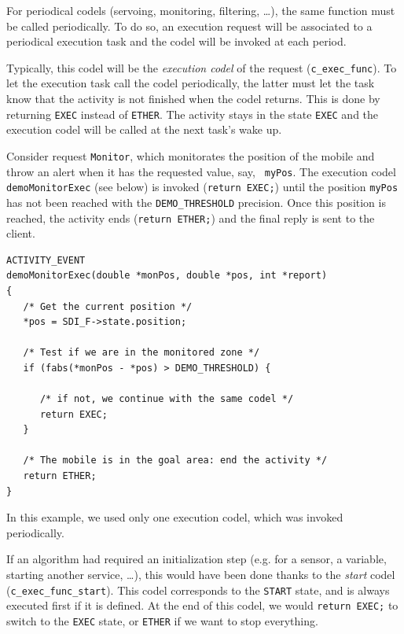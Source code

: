 For periodical codels (servoing, monitoring, filtering, \ldots), the same
function must be called periodically. To do so, an execution request will
be associated  to  a periodical  execution task  and  the  codel will  be
invoked at each period.

Typically, this codel  will be the {\em  execution codel} of the  request
({\tt  c\_exec\_func}).  To let   the    execution task call   the  codel
periodically, the latter must let the task know that  the activity is not
finished  when the codel  returns.  This is done  by returning {\tt EXEC}
instead  of {\tt ETHER}.  The activity stays  in the state {\tt EXEC} and
the execution codel will be called at the next task's wake up.

Consider request {\tt Monitor},   which monitorates the position   of the
mobile and  throw an  alert when it   has the requested value, say,  {\tt
myPos}.  The  execution codel  {\tt  demoMonitorExec} (see below)  is invoked
({\tt return EXEC;}) until the position {\tt myPos}  has not been reached
with the {\tt DEMO\_THRESHOLD} precision. Once  this position is reached,
the activity ends ({\tt return  ETHER;}) and the  final reply is sent  to
the client.

\begin{center}\begin{cartouche}\small\begin{verbatim}
ACTIVITY_EVENT
demoMonitorExec(double *monPos, double *pos, int *report)
{
   /* Get the current position */
   *pos = SDI_F->state.position;

   /* Test if we are in the monitored zone */
   if (fabs(*monPos - *pos) > DEMO_THRESHOLD) {

      /* if not, we continue with the same codel */
      return EXEC;
   }

   /* The mobile is in the goal area: end the activity */
   return ETHER;
}
\end{verbatim}\end{cartouche}\end{center}

In this example,   we used only  one execution  codel, which  was invoked
periodically.

If an algorithm had required an  initialization step (e.g.  for a sensor,
a variable, starting another service, \ldots), this  would have been done
thanks to the {\em start} codel ({\tt c\_exec\_func\_start}).  This codel
corresponds to the {\tt START} state, and  is always executed first if it
is  defined. At the  end  of this codel,  we  would {\tt return EXEC;} to
switch to  the {\tt  EXEC} state, or   {\tt ETHER} if   we  want to  stop
everything.

